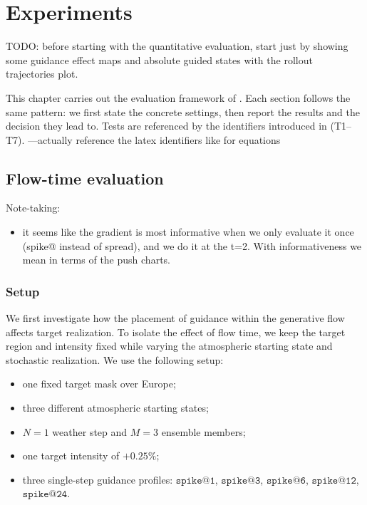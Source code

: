 \chapter{Experiments}\label{ch:experiments}


TODO: before starting with the quantitative evaluation, start just by showing some guidance effect maps and absolute guided states with the rollout trajectories plot.

This chapter carries out the evaluation framework of . 
Each section follows the same pattern: we first state the concrete settings, then report the results and the decision they lead to. 
Tests are referenced by the identifiers introduced in  (T1--T7).
---actually reference the latex identifiers like for equations

\section{Flow-time evaluation}
\label{sec:exp-flow}

Note-taking:
\begin{itemize}
    \item it seems like the gradient is most informative when we only evaluate it once (spike@ instead of spread), and we do it at the t=2. With informativeness we mean in terms of the push charts.
\end{itemize}

\subsection{Setup}

We first investigate how the placement of guidance within the generative flow
affects target realization. To isolate the effect of flow time, we keep the
target region and intensity fixed while varying the atmospheric starting state
and stochastic realization. We use the following setup:

\begin{itemize}[noitemsep]
    \item one fixed target mask over Europe;
    \item three different atmospheric starting states;
    \item $N=1$ weather step and $M=3$ ensemble members;
    \item one target intensity of $+0.25\%$;
    \item three single-step guidance profiles:
    $\texttt{spike@1}$, $\texttt{spike@3}$, $\texttt{spike@6}$, $\texttt{spike@12}$, $\texttt{spike@24}$.
\end{itemize}

